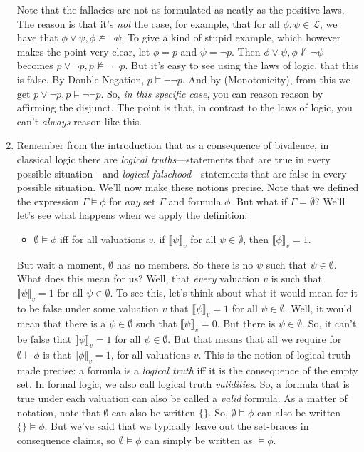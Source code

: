 \begin{enumerate}[\thesection.1]
	Note that the fallacies are not as formulated as neatly as the positive laws. The reason is that it's \emph{not} the case, for example, that for all $\phi,\psi\in\mathcal{L}$, we have that $\phi\lor\psi,\phi\nvDash\neg\psi$. To give a kind of stupid example, which however makes the point very clear, let $\phi=p$ and $\psi=\neg p$. Then $\phi\lor\psi,\phi\nvDash\neg\psi$ becomes $p\lor\neg p, p\nvDash \neg\neg p$. But it's easy to see using the laws of logic, that this is false. By Double Negation, $p\vDash \neg\neg p$. And by (Monotonicity), from this we get $p\lor\neg p, p\vDash \neg\neg p$. So, \emph{in this specific case}, you can reason reason by affirming the disjunct. The point is that, in contrast to the laws of logic, you can't \emph{always} reason like this. 
	
	\item Remember from the introduction that as a consequence of bivalence, in classical logic there are \emph{logical truths}---statements that are true in every possible situation---and \emph{logical falsehood}---statements that are false in every possible situation. We'll now make these notions precise. Note that we defined the expression $\Gamma\vDash \phi$ for \emph{any} set $\Gamma$ and formula $\phi$. But what if $\Gamma=\emptyset$? We'll let's see what happens when we apply the definition:
	\begin{itemize}
	
		\item $\emptyset\vDash\phi$ iff for all valuations $v$, if $\llbracket\psi\rrbracket_v$ for all $\psi\in\emptyset$, then $\llbracket\phi\rrbracket_v=1$. 
	
	\end{itemize}
But wait a moment, $\emptyset$ has no members. So there is no $\psi$ such that $\psi\in \emptyset$. What does this mean for us? Well, that \emph{every} valuation $v$ is such that $\llbracket\psi\rrbracket_v=1$ for all $\psi\in\emptyset$. To see this, let's think about what it would mean for it to be false under some valuation $v$ that $\llbracket\psi\rrbracket_v=1$ for all $\psi\in\emptyset$. Well, it would mean that there is a $\psi\in\emptyset$ such that $\llbracket\psi\rrbracket_v=0$. But there is $\psi\in\emptyset$. So, it can't be false that $\llbracket\psi\rrbracket_v=1$ for all $\psi\in\emptyset$. But that means that all we require for $\emptyset\vDash\phi$ is that $\llbracket\phi\rrbracket_v=1$, for all valuations $v$. This is the notion of logical truth made precise: a formula is a \emph{logical truth} iff it is the consequence of the empty set. In formal logic, we also call logical truth \emph{validities}. So, a formula that is true under each valuation can also be called a \emph{valid} formula. As a matter of notation, note that $\emptyset$ can also be written $\{\}$. So, $\emptyset\vDash\phi$ can also be written $\{\}\vDash\phi$. But we've said that we typically leave out the set-braces in consequence claims, so $\emptyset\vDash\phi$ can simply be written as $\vDash\phi$.


\end{enumerate}
